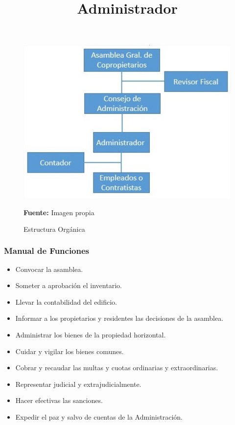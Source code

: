 \begin{figure}[h!]
	\centering
	\includegraphics[width=0.7\linewidth]{arquitectura/organizacion/imgs/organigrama}
	\caption{Estructura Orgánica}{\scriptsize \textbf{Fuente:} Imagen propia}
\end{figure}

\subsubsection{Manual de Funciones}

\title{Administrador}


\begin{itemize}
\item Convocar la asamblea.
\item Someter a aprobación el inventario.
\item Llevar la contabilidad del edificio.
\item Informar a los propietarios y residentes las decisiones de la asamblea.
\item Administrar los bienes de la propiedad horizontal.
\item Cuidar y vigilar los bienes comunes.
\item Cobrar y recaudar las multas y cuotas ordinarias y extraordinarias.
\item Representar judicial y extrajudicialmente.
\item Hacer efectivas las sanciones.
\item Expedir el paz y salvo de cuentas de la Administración.
\end{itemize}


